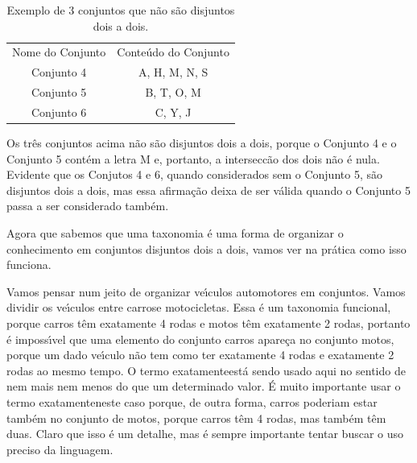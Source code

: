 \documentclass[
12pt,		%
openright,	%
twoside,  %
a4paper,			%
chapter=TITLE,		%
english,			%
french,				%
spanish,			%
brazil				%
]{USPSC-classe/USPSC}
\begin{document}
\begin{table}[htb]
\tiny
\caption{\label{addf8ab306d7b3223b701a4f6624e64135528ac6}Exemplo de 3 conjuntos que n\~ao s\~ao disjuntos dois a dois.}

\centering
\begin{tabular}{|c|c|}
\hline
Nome do Conjunto  &  Conte\'udo do Conjunto \\
Conjunto 4  &  A, H, M, N, S \\
Conjunto 5  &  B, T, O, M \\
Conjunto 6  &  C, Y, J \\
\hline
\end{tabular}
\end{table}


Os tr\^es conjuntos acima n\~ao s\~ao disjuntos dois a dois, porque o Conjunto 4 e o Conjunto 5 cont\'em a letra M e, portanto, a intersecc\~ao dos dois n\~ao \'e nula. Evidente que os Conjutos 4 e 6, quando considerados sem o Conjunto 5, s\~ao \textquotedbl disjuntos dois a dois\textquotedbl , mas essa afirma\c{c}\~ao deixa de ser v\'alida quando o Conjunto 5 passa a ser considerado tamb\'em.














Agora que sabemos que uma taxonomia \'e uma forma de organizar o conhecimento em conjuntos disjuntos dois a dois, vamos ver na pr\'atica como isso funciona.














Vamos pensar num jeito de organizar ve\'{\i}culos automotores em conjuntos. Vamos dividir os ve\'{\i}culos entre \textquotedbl carros\textquotedbl  e \textquotedbl motocicletas\textquotedbl . Essa \'e um taxonomia funcional, porque carros t\^em exatamente 4 rodas e motos t\^em exatamente 2 rodas, portanto \'e imposs\'{\i}vel que uma elemento do conjunto carros apare\c{c}a no conjunto motos, porque um dado ve\'{\i}culo n\~ao tem como ter exatamente 4 rodas e exatamente 2 rodas ao mesmo tempo. O termo \textquotedbl exatamente\textquotedbl  est\'a sendo usado aqui no sentido de \textquotedbl nem mais nem menos do que um determinado valor\textquotedbl . \'E muito importante usar o termo \textquotedbl exatamente\textquotedbl  neste caso porque, de outra forma, carros poderiam estar tamb\'em no conjunto de motos, porque carros t\^em 4 rodas, mas tamb\'em t\^em duas. Claro que isso \'e um detalhe, mas \'e sempre importante tentar buscar o uso preciso da linguagem.
\end{document}
